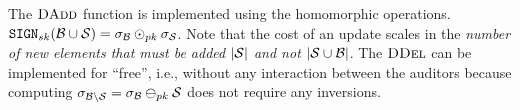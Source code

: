 The $\textsc{DAdd}$ function is implemented using the homomorphic operations. $\sign[\privKey](\blocklist \cup \genericSetVar) = \genericSig[\blocklist] \sigHomomorphism[\pubKey] \genericSig[\genericSetVar]$. Note that the cost of an update scales in the \emph{number of new elements that must be added $\setSize{\genericSetVar}$ and not $\setSize{\genericSetVar \cup \blocklist}$}. The $\textsc{DDel}$ can be implemented for ``free'', i.e., without any interaction between the auditors because computing $\genericSig[\blocklist \setminus \genericSetVar] = \genericSig[\blocklist] \sigMinus[\pubKey] \genericSetVar$ does not require any inversions.  
\fi 


